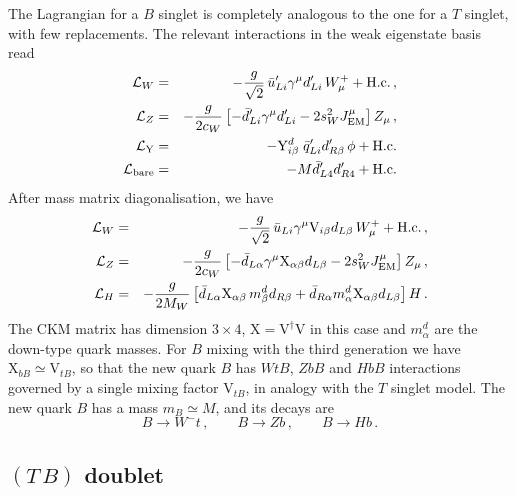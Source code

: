 \documentclass[12pt,a4paper]{article}
\newcommand{\TB}{(T \, B)}
\newcommand{\gm}{\gamma^\mu}
\newcommand{\Wmp}{W_\mu^+}
\newcommand{\Zm}{Z_\mu}
\begin{document}
The Lagrangian for a $B$ singlet is completely analogous to the one for a $T$ singlet, with few replacements. The relevant interactions in the weak eigenstate basis read
\begin{eqnarray}
\mathcal{L}_W & = & -\frac{g}{\sqrt 2} \, \bar u_{Li}' \gm d_{Li}' \, \Wmp + \text{H.c.}
\,, \notag \\
%
\mathcal{L}_Z & = & -\frac{g}{2 c_W} \left[- \bar d_{Li}' \gm d_{Li}' - 2 s_W^2 J_\text{EM}^\mu \right] \Zm \,, \notag \\
%
\mathcal{L}_\mathrm{Y} & = & - \mathrm{Y}_{i\beta}^d \; \bar q_{Li}' d_{R\beta}' \, \phi
+ \text{H.c.} \notag \\
\mathcal{L}_\text{bare}  & = & - M \bar d_{L4}' d_{R4}' + \text{H.c.}
\end{eqnarray}
After mass matrix diagonalisation, we have
\begin{eqnarray}
\mathcal{L}_W & = & -\frac{g}{\sqrt 2} \, \bar u_{Li} \gm \mathrm{V}_{i\beta} d_{L\beta} \, \Wmp + \text{H.c.} \,, \notag \\
%
\mathcal{L}_Z & = & -\frac{g}{2 c_W} \left[ - \bar d_{L\alpha} \gm \mathrm{X}_{\alpha \beta} d_{L\beta} - 2 s_W^2 J_\text{EM}^\mu \right] \Zm
\,, \notag \\
%
\mathcal{L}_H & = & - \frac{g}{2 M_W} \left[
\bar d_{L\alpha} \mathrm{X}_{\alpha \beta} \, m^d_\beta d_{R\beta} + \bar d_{R\alpha} m^d_\alpha \mathrm{X}_{\alpha \beta} d_{L\beta} \right] H \,.
\end{eqnarray}
The CKM matrix has dimension $3\times 4$, $\mathrm{X} = \mathrm{V}^\dagger \mathrm{V}$ in this case and $m_\alpha^d$ are the down-type quark masses. For $B$ mixing with the third generation we have $\mathrm{X}_{bB} \simeq \mathrm{V}_{tB}$, so that the new quark $B$ has $WtB$, $ZbB$ and $HbB$ interactions governed by a single mixing factor $\mathrm{V}_{tB}$, in analogy with the $T$ singlet model. The 
new quark $B$ has a mass $m_B \simeq M$, and its decays are
\begin{equation}
B \to W^- t \,,\quad \quad B \to Zb \,,\quad \quad B \to Hb \,.
\end{equation}




\subsection{$\TB$ doublet}
\label{sec:2.3}
\end{document}
